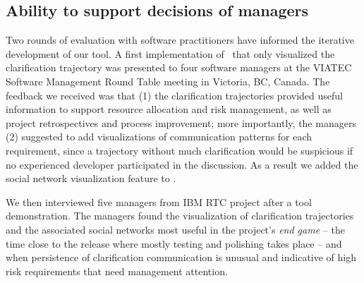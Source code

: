 \subsection{Ability to support decisions of managers}
Two rounds of evaluation with software practitioners have informed the iterative development of our tool. A first implementation of \viss\ that only visualized the clarification trajectory was presented to four software managers at the VIATEC Software Management Round Table meeting in Victoria, BC, Canada. The feedback we received was that (1) the clarification trajectories provided useful information to support resource allocation and risk management, as well as project retrospectives and process improvement; more importantly, the managers (2) suggested to add visualizations of communication patterns for each requirement, since a trajectory without much clarification would be suspicious if no experienced developer participated in the discussion. As a result we added the social network visualization feature to \viss. 


We then interviewed five managers from IBM RTC project after a tool demonstration. The managers found the visualization of clarification trajectories and the associated social networks most useful in the project's \emph{end game} -- the time close to the release where mostly testing and polishing takes place -- and when persistence of  clarification communication is unusual and indicative of high risk requirements that need management attention.
